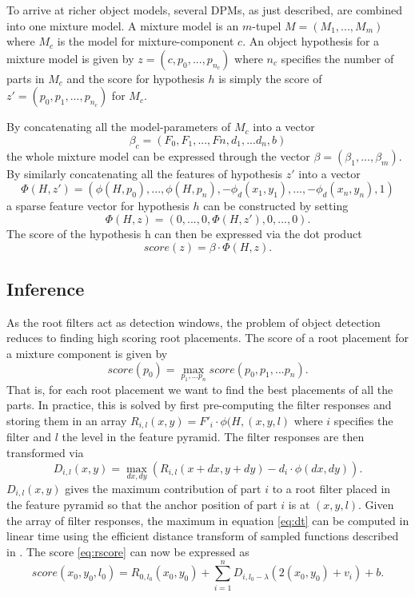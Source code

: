 To arrive at richer object models, several DPMs, as just described, are combined into one mixture model. A mixture model is an $m$-tupel $M=(M_1,...,M_m)$ where $M_c$ is the model for mixture-component $c$. An object hypothesis for a mixture model is given by $z=(c,p_0,...,p_{n_c})$ where $n_c$ specifies the number of parts in $M_c$ and the score for hypothesis $h$ is simply the score of $z'=(p_0,p_1,...,p_{n_c})$ for $M_c$.

By concatenating all the model-parameters of $M_c$ into a vector 
\begin{equation}
\beta_c=(F_0,F_1,...,Fn,d_1,...d_n,b)
\end{equation}
the whole mixture model can be  expressed through the vector $\beta=(\beta_1,...,\beta_m)$.
By similarly concatenating all the features of hypothesis $z'$ into a vector
\begin{equation}
\Phi(H,z')=(\phi(H,p_0),...,\phi(H,p_n),-\phi_d(x_1,y_1),...,-\phi_d(x_n,y_n),1)
\end{equation}
a sparse feature vector for hypothesis $h$ can be constructed by setting 
\begin{equation}
\Phi(H,z)=(0,...,0,\Phi(H,z'),0,...,0).
\end{equation}
The score of the hypothesis h can then be expressed via the dot product
\begin{equation}\label{eq:vecscore}
score(z)=\beta\cdot \Phi(H,z).
\end{equation}

\subsection{Inference}

As the root filters act as detection windows, the problem of object detection reduces to finding high scoring root placements. The score of a root placement for a mixture component is given by
\begin{equation}\label{eq:rscore}
score(p_0)=\max_{p_1,...p_n}score(p_0,p_1,...p_n).
\end{equation}
That is, for each root placement we want to find the best placements of all the parts. In practice, this is solved by first pre-computing the filter responses and storing them in an array $R_{i,l}(x,y)=F'_i\cdot\phi(H,(x,y,l)$ where $i$ specifies the filter and $l$ the level in the feature pyramid. The filter responses are then transformed via 
\begin{equation}\label{eq:dt}
D_{i,l}(x,y)=\max_{dx,dy}( R_{i,l}(x+dx,y+dy)-d_i\cdot\phi(dx,dy)).
\end{equation}
$D_{i,l}(x,y)$ gives the maximum contribution of part $i$ to a root filter placed in the feature pyramid so that the anchor position of part $i$ is at $(x,y,l)$. Given the array of filter responses, the maximum in equation \ref{eq:dt} can be computed in linear time using the efficient distance transform of sampled functions described in \cite{felzenszwalb2004distance}. The score \ref{eq:rscore} can now be expressed as
\begin{equation}
score(x_0,y_0,l_0)=R_{0,l_0}(x_0,y_0)+\sum_{i=1}^n D_{i,l_0-\lambda}(2(x_0,y_0)+v_i)+b.
\end{equation}

